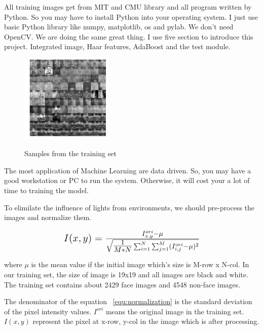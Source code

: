 \documentclass[a4paper, 11pt]{article} %
\begin{document}
All training images get from MIT and CMU library and all program written by Python. So you may have to install Python into your operating system. I just use basic Python library like numpy, matplotlib, os and pylab. We don't need OpenCV. We are doing the same great thing. I use five section to introduce this project. Integrated image, Haar features, AdaBoost and the test module.

\begin{figure}[H]
    \centering
    \includegraphics[width=0.38\textwidth]{../figure/combinedImage.jpg}
    \label{fig:combinedImage}
    \caption{Samples from the training set}
\end{figure}

The most application of Machine Learning are data driven. So, you may have a good workstation or PC to run the system. Otherwise, it will cost your a lot of time to training the model. 


To elimilate the influence of lights from environments, we should pre-process the images and normalize them.

    \begin{equation}
        \mathlarger{
        \mathlarger{
        \centering
        I(x,y) = \tfrac{I^{ori}_{x,y} - \mu}{\sqrt{\tfrac{1}{M*N} \sum_{i = 1}^{N}\sum_{j = 1}^{M} (I^{ori}_{i,j} - \mu)^{2} }}
        }
        }
        \label{equ:normalization}
    \end{equation}

    where $\mu$ is the mean value if the initial image which's size is M-row x N-col. In our training set, the size of image is 19x19 and all images are black and white. The training set contains about 2429 face images and 4548 non-face images.

    The denominator of the equation ~\ref{equ:normalization} is the standard deviation of the pixel intensity values. $I^{ori}$ means the original image in the training set. $I(x, y)$ represent the pixel at x-row, y-col in the image which is after processing.
    
\end{document}
